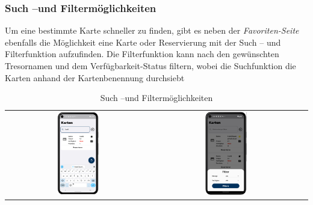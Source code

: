 \subsubsection{Such –und Filtermöglichkeiten}
Um eine bestimmte Karte schneller zu finden, gibt es neben der {\textit{Favoriten-Seite}} ebenfalls die Möglichkeit eine Karte oder Reservierung mit der Such – und Filterfunktion aufzufinden. Die Filterfunktion kann nach den gewünschten Tresornamen und dem Verfügbarkeit-Status filtern, wobei die Suchfunktion die Karten anhand der Kartenbenennung durchsiebt
\begin{table}[htbp]
  \centering
  \begin{tabular}{ccc}
    \includegraphics[width=0.3\textwidth]{FLUTTER/images/GP/Search.png}&
    \includegraphics[width=0.3\textwidth]{FLUTTER/images/GP/Filter.png}
    \\
  \end{tabular}
  \captionsetup{type=figure}
  \caption{Such –und Filtermöglichkeiten}
  \label{tab:example}
\end{table}

